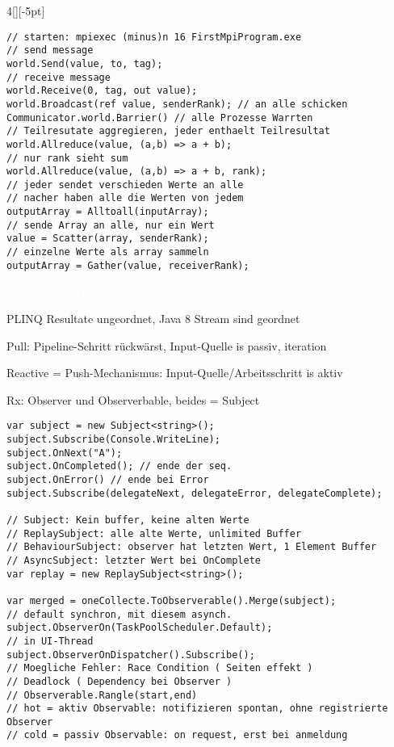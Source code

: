 \documentclass[%
	pdftex,%
	a4paper,%
	landscape,%
	ngerman,
	oneside,%
	6pt,%
	halfparskip,%
]{scrbook}
\newenvironment{mainbox}{%
  \def\FrameCommand{\fboxrule 1px \fcolorbox{black}{spec_blue}}%
  \MakeFramed {\advance\hsize-\width \FrameRestore}}%
 {\endMakeFramed}
\newcommand{\maintopic}[1]{\setcounter{subtopicenum}{0}\setcounter{subsubtopicenum}{0}\vspace{-4px}\begin{mainbox}\textcolor{white}{\textbf{\large{\stepcounter{maintopicenum}\Roman{maintopicenum}. #1}}}\end{mainbox}\vspace{-4px}}
\newenvironment{tight-itemize}
{ \begin{itemize}
    \setlength{\itemsep}{0px}
    \setlength{\parskip}{0px}
    \setlength{\parsep}{0px}  }
{ \end{itemize}                  }
\begin{document}
\begin{multicols}{4}[][-5pt]
\begin{lstlisting}
// starten: mpiexec (minus)n 16 FirstMpiProgram.exe  
// send message
world.Send(value, to, tag);
// receive message
world.Receive(0, tag, out value);
world.Broadcast(ref value, senderRank); // an alle schicken
Communicator.world.Barrier() // alle Prozesse Warrten
// Teilresutate aggregieren, jeder enthaelt Teilresultat
world.Allreduce(value, (a,b) => a + b);
// nur rank sieht sum
world.Allreduce(value, (a,b) => a + b, rank);
// jeder sendet verschieden Werte an alle 
// nacher haben alle die Werten von jedem
outputArray = Alltoall(inputArray); 
// sende Array an alle, nur ein Wert
value = Scatter(array, senderRank);
// einzelne Werte als array sammeln
outputArray = Gather(value, receiverRank);
\end{lstlisting}

\maintopic{Reactive Programming}
\begin{tight-itemize}
	\item{PLINQ Resultate ungeordnet, Java 8 Stream sind geordnet}
	\item{Pull: Pipeline-Schritt rückwärst, Input-Quelle is passiv, iteration}
	\item{Reactive = Push-Mechanismus: Input-Quelle/Arbeitsschritt is aktiv }
	\item{Rx: Observer und Observerbable, beides = Subject}
\end{tight-itemize}

\begin{lstlisting}
var subject = new Subject<string>();
subject.Subscribe(Console.WriteLine);
subject.OnNext("A");
subject.OnCompleted(); // ende der seq. 
subject.OnError() // ende bei Error
subject.Subscribe(delegateNext, delegateError, delegateComplete);

// Subject: Kein buffer, keine alten Werte
// ReplaySubject: alle alte Werte, unlimited Buffer
// BehaviourSubject: observer hat letzten Wert, 1 Element Buffer
// AsyncSubject: letzter Wert bei OnComplete
var replay = new ReplaySubject<string>();

var merged = oneCollecte.ToObserverable().Merge(subject);
// default synchron, mit diesem asynch.
subject.ObserverOn(TaskPoolScheduler.Default); 
// in UI-Thread
subject.ObserverOnDispatcher().Subscribe();
// Moegliche Fehler: Race Condition ( Seiten effekt )
// Deadlock ( Dependency bei Observer )
// Observerable.Rangle(start,end)
// hot = aktiv Observable: notifizieren spontan, ohne registrierte Observer
// cold = passiv Observable: on request, erst bei anmeldung
\end{lstlisting}


\end{multicols}
\end{document}
